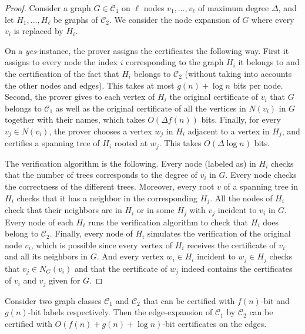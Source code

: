 \documentclass[a4paper,thm-restate,USenglish]{lipics-v2019}
\begin{document}
\begin{proof}
Consider a graph $G\in \mathcal{C}_1$ on $\ell$ nodes $v_1,\ldots,v_\ell$ of maximum degree $\Delta$, and let $H_1,\ldots,H_\ell$ be graphs of $\mathcal{C}_2$. We consider the node expansion of $G$ where every $v_i$ is replaced by $H_i$.

On a \emph{yes}-instance, the prover assigns the certificates the following way. 
First it assigns to every node the index $i$ corresponding to the graph $H_i$ it belongs to and the certification of the fact that $H_i$ belongs to $\mathcal{C}_2$ (without taking into accounts the other nodes and edges).
This takes at most $g(n)+\log n$ bits per node.
Second, the prover gives to each vertex of $H_i$ the original certificate of $v_i$ that $G$ belongs to $\mathcal{C}_1$ as well as the original certificate of all the vertices in $N(v_i)$ in $G$ together with their names, which takes $O(\Delta f(n))$ bits. Finally, for every $v_j\in N(v_i)$, the prover chooses a vertex $w_j$ in $H_i$ adjacent to a vertex in $H_j$, and certifies a spanning tree of $H_i$ rooted at $w_j$. This takes $O(\Delta\log n)$ bits.
    
The verification algorithm is the following. 
Every node (labeled as) in $H_i$ checks that the number of trees corresponds to the degree of $v_i$ in $G$.
Every node checks the correctness of the different trees. Moreover, every root $v$ of a spanning tree in $H_i$ checks that it has a neighbor in the corresponding $H_j$.
All the nodes of $H_i$ check that their neighbors are in $H_i$ or in some $H_j$ with $v_j$ incident to $v_i$ in $G$.
Every node of each $H_i$ runs the verification algorithm to check that $H_i$ does belong to $\mathcal{C}_2$.
Finally, every node of $H_i$ simulates the verification of the original node $v_i$, which is possible since every vertex of $H_i$ receives the certificate of $v_i$ and all its neighbors in $G$. And every vertex $w_i \in H_i$ incident to $w_j \in H_j$ checks that $v_j\in N_G(v_i)$ and that the certificate of $w_j$ indeed contains the certificates of $v_i$ and $v_j$ given for $G$. 
\end{proof}

\begin{proposition}
\label{prop:edge-expansion}
Consider two graph classes $\mathcal{C}_1$ and $\mathcal{C}_2$ that can be certified with $f(n)$-bit and $g(n)$-bit labels respectively. 
Then the edge-expansion of $\mathcal{C}_1$ by $\mathcal{C}_2$ can be certified with $O(f(n)+g(n)+\log n)$-bit certificates on the edges. 
\end{proposition}
\end{document}
